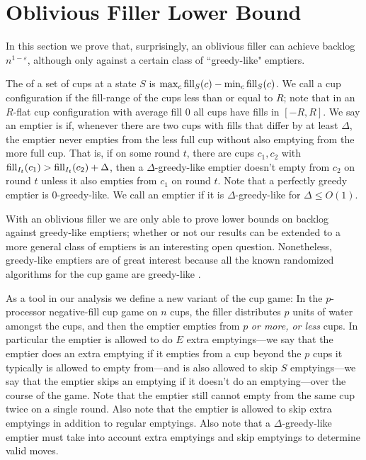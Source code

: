 \section{Oblivious Filler Lower Bound}\label{sec:oblivious}
In this section we prove that, surprisingly, an oblivious filler
can achieve backlog $n^{1-\varepsilon}$, although only against a
certain class of ``greedy-like" emptiers.

The  of a set of cups at a state $S$ is $\max_c
\operatorname{\textnormal{fill}}_S(c) - \min_c \operatorname{\textnormal{fill}}_S(c)$. We call a cup configuration
 if the fill-range of the cups less than or equal to
$R$; note that in an $R$-flat cup configuration with average fill
$0$ all cups have fills in $[-R, R]$. We say an emptier is
 if, whenever there are two cups with
fills that differ by at least $\Delta$, the emptier never empties
from the less full cup without also emptying from the more full
cup. That is, if on some round $t$, there are cups $c_1, c_2$
with $\operatorname{\textnormal{fill}}_{I_t}(c_1) > \operatorname{\textnormal{fill}}_{I_t}(c_2) + \Delta$, then a
$\Delta$-greedy-like emptier doesn't empty from $c_2$ on round
$t$ unless it also empties from $c_1$ on round $t$. Note that a
perfectly greedy emptier is $0$-greedy-like. We call an emptier
 if it is $\Delta$-greedy-like for $\Delta \le
O(1)$. 

With an oblivious filler we are only able to prove lower bounds
on backlog against greedy-like emptiers; whether or not our
results can be extended to a more general class of emptiers is an
interesting open question. Nonetheless, greedy-like emptiers are
of great interest because all the known randomized algorithms for
the cup game are greedy-like \cite{mbe19, wku20}.

As a tool in our analysis we define a new variant of the cup
game: In the $p$-processor 
 negative-fill cup game on $n$ cups, the filler
distributes $p$ units of water amongst the cups, and then the
emptier empties from $p$ \textit{or more, or less} cups. In
particular the emptier is allowed to do $E$ extra
emptyings---we say that the emptier does an extra emptying if
it empties from a cup beyond the $p$ cups it typically is
allowed to empty from---and is also allowed to skip $S$
emptyings---we say that the emptier skips an emptying if it
doesn't do an emptying---over the course of the
game. Note that the emptier still cannot empty from the same cup
twice on a single round. Also note that the emptier is allowed to
skip extra emptyings in addition to regular emptyings. Also note
that a $\Delta$-greedy-like emptier must take into account extra
emptyings and skip emptyings to determine valid moves. 

